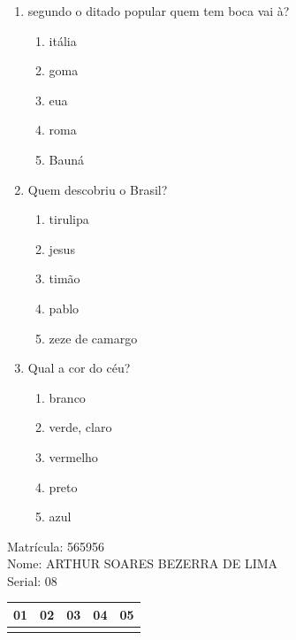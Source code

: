 \documentclass[10pt,a4paper,twocolumn]{report}
\begin{document}
 \begin{enumerate} 
    \item  segundo o ditado popular quem tem boca vai à?





    \begin{enumerate}
    \item  itália

\item  goma

\item  eua

\item  roma

\item  Bauná


    \end{enumerate} 
    \item  Quem descobriu o Brasil?





    \begin{enumerate}
    \item  tirulipa

\item  jesus

\item  timão

\item  pablo

\item  zeze de camargo


    \end{enumerate} 
    \item  Qual a cor do céu?





    \begin{enumerate}
    \item  branco

\item  verde, claro

\item  vermelho

\item  preto

\item  azul


    \end{enumerate}\end{enumerate} 
Matrícula: 565956\\ Nome: ARTHUR SOARES BEZERRA DE LIMA \\ Serial: 08\\
\begin{tabular}{|l|l|l|l|l|}\hline
01  &02  &03  &04  &05 \\ \hline 
 & & & & \\ \hline 
\end{tabular}
 \cleardoublepage 
\end{document}
